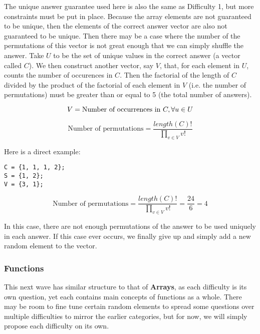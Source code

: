 \documentclass{article}
\begin{document}
The unique answer guarantee used here is also the same as Difficulty 1, but more constraints must be put in place. Because the array elements are not guaranteed to be unique, then the
elements of the correct answer vector are also not guaranteed to be unique. Then there may be a case where the number of the permutations of this vector is not great enough that we can simply shuffle 
the answer. Take $ U $ to be the set of unique values in the correct answer (a vector called $ C $). We then construct another vector, say $ V $, that, for each element in $ U $, counts the number of occurences in $ C $.  Then the factorial of the length of $ C $ divided by the product of the factorial of each element in $ V $ 
 (i.e. the number of permutations) must be greater than or equal to 5 (the total number of answers).

\begin{equation*}
V = \textrm{Number of occurrences in } C, \forall \- u \in U
\end{equation*}

\begin{equation*}
\textrm{Number of permutations} = \frac{length(C)!}{\displaystyle \prod_{v \in V} v!}
\end{equation*}

\noindent Here is a direct example:

\begin{Verbatim}
C = {1, 1, 1, 2};
S = {1, 2}; 
V = {3, 1};
\end{Verbatim}
\begin{equation*}
\textrm{Number of permutations} = \frac{length(C)!}{\displaystyle \prod_{v \in V} v!} = \frac{24}{6} = 4
\end{equation*}


In this case, there are not enough permutations of the answer to be used uniquely in each answer. If this case ever occurs, we finally give up and simply add a new random element to the 
vector.

\subsubsection{Functions} \label{subsubsec-functions}

This next wave has similar structure to that of \textbf{Arrays}, as each difficulty is its own question, yet each contains main concepts of functions as a whole. There may be room to fine tune certain 
random elements to spread some questions over multiple difficulties to mirror the earlier categories, but for now, we will simply propose each difficulty on its own. 
\end{document}
